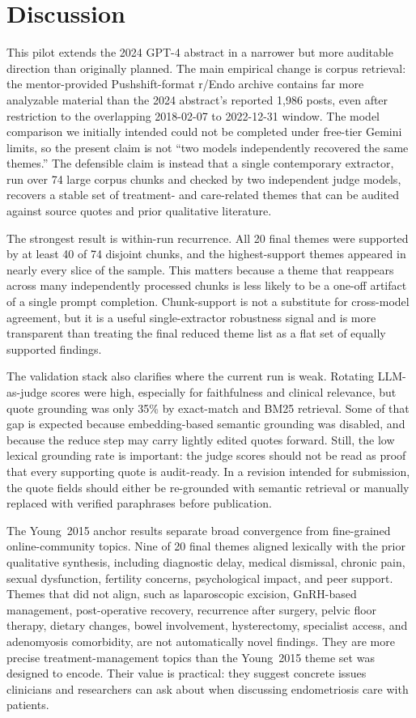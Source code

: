 \section{Discussion}

This pilot extends the 2024 GPT-4 abstract in a narrower but more
auditable direction than originally planned. The main empirical change
is corpus retrieval: the mentor-provided Pushshift-format r/Endo archive
contains far more analyzable material than the 2024 abstract's reported
1{,}986 posts, even after restriction to the overlapping 2018-02-07 to
2022-12-31 window. The model comparison we initially intended could not
be completed under free-tier Gemini limits, so the present claim is not
``two models independently recovered the same themes.'' The defensible
claim is instead that a single contemporary extractor, run over 74
large corpus chunks and checked by two independent judge models, recovers
a stable set of treatment- and care-related themes that can be audited
against source quotes and prior qualitative literature.

The strongest result is within-run recurrence. All 20 final themes were
supported by at least 40 of 74 disjoint chunks, and the highest-support
themes appeared in nearly every slice of the sample. This matters
because a theme that reappears across many independently processed
chunks is less likely to be a one-off artifact of a single prompt
completion. Chunk-support is not a substitute for cross-model
agreement, but it is a useful single-extractor robustness signal and is
more transparent than treating the final reduced theme list as a flat
set of equally supported findings.

The validation stack also clarifies where the current run is weak.
Rotating LLM-as-judge scores were high, especially for faithfulness and
clinical relevance, but quote grounding was only 35\% by exact-match
and BM25 retrieval. Some of that gap is expected because embedding-based
semantic grounding was disabled, and because the reduce step may carry
lightly edited quotes forward. Still, the low lexical grounding rate is
important: the judge scores should not be read as proof that every
supporting quote is audit-ready. In a revision intended for submission,
the quote fields should either be re-grounded with semantic retrieval or
manually replaced with verified paraphrases before publication.

The Young~2015 anchor results separate broad convergence from
fine-grained online-community topics. Nine of 20 final themes aligned
lexically with the prior qualitative synthesis, including diagnostic
delay, medical dismissal, chronic pain, sexual dysfunction, fertility
concerns, psychological impact, and peer support. Themes that did not
align, such as laparoscopic excision, GnRH-based management,
post-operative recovery, recurrence after surgery, pelvic floor
therapy, dietary changes, bowel involvement, hysterectomy, specialist
access, and adenomyosis comorbidity, are not automatically novel
findings. They are more precise treatment-management topics than the
Young~2015 theme set was designed to encode. Their value is practical:
they suggest concrete issues clinicians and researchers can ask about
when discussing endometriosis care with patients.


